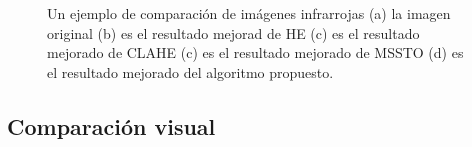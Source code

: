 \documentclass[a4paper, 11 pt, conference]{ieeeconf}      %
\begin{document}
\begin{figure}
    \centering
     \\
    \\
    \caption{Un ejemplo de comparaci\'on de im\'agenes infrarrojas (a) la imagen original (b) es el resultado mejorad de HE (c) es el resultado mejorado de CLAHE (c) es el resultado mejorado de MSSTO (d) es el resultado mejorado del algoritmo propuesto.}
    \label{fig:fig5}

\end{figure}

\subsection{Comparaci\'on visual}
\end{document}
